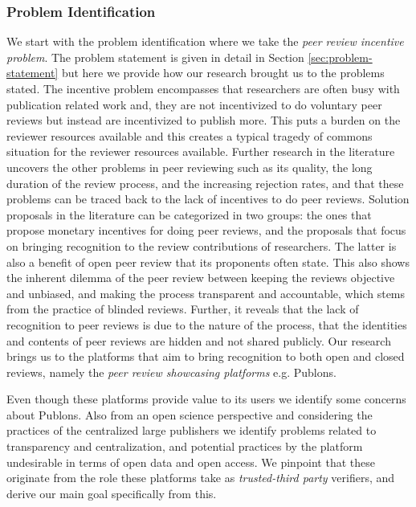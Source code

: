 \subsubsection{Problem Identification}

We start with the problem identification where we take the \textit{peer review incentive problem}. The problem statement is given in detail in Section \ref{sec:problem-statement} but here we provide how our research brought us to the problems stated. The incentive problem encompasses that researchers are often busy with publication related work and, they are not incentivized to do voluntary peer reviews but instead are incentivized to publish more. This puts a burden on the reviewer resources available and this creates a typical tragedy of commons situation \parencite{hardin2009tragedy, Hochberg.2009} for the reviewer resources available. Further research in the literature uncovers the other problems in peer reviewing such as its quality, the long duration of the review process, and the increasing rejection rates, and that these problems can be traced back to the lack of incentives to do peer reviews. Solution proposals in the literature can be categorized in two groups: the ones that propose monetary incentives for doing peer reviews, and the proposals that focus on bringing recognition to the review contributions of researchers. The latter is also a benefit of open peer review that its proponents often state. This also shows the inherent dilemma of the peer review between keeping the reviews objective and unbiased, and making the process transparent and accountable, which stems from the practice of blinded reviews. Further, it reveals that the lack of recognition to peer reviews is due to the nature of the process, that the identities and contents of peer reviews are hidden and not shared publicly. Our research brings us to the platforms that aim to bring recognition to both open and closed reviews, namely the \textit{peer review showcasing platforms} e.g. Publons. 

Even though these platforms provide value to its users we identify some concerns about Publons. Also from an open science perspective and considering the practices of the centralized large publishers \parencite{Lariviere.2015} we identify problems related to transparency and centralization, and potential practices by the platform undesirable in terms of open data and open access. We pinpoint that these originate from the role these platforms take as \textit{trusted-third party} verifiers, and derive our main goal specifically from this. 

